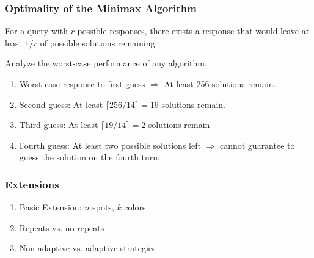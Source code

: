 \documentclass{beamer}
\begin{document}
    \begin{frame}
    	\frametitle{Optimality of the Minimax Algorithm}
	\begin{tcolorbox}[colback=blue!5,colframe=blue!40!black,title=Lemma (Pigeonhole Principle)]
	For a query with $r$ possible responses, there exists a response that would leave
	at least $1/r$ of possible solutions remaining.
	\end{tcolorbox}
	Analyze the worst-case performance of any algorithm. \\
		\begin{enumerate}[label=\roman*.]
		\item Worst case response to first guess $\Rightarrow$ At least 256 solutions
		remain.
		\item Second guess:  At least $\lceil 256/14 \rceil = 19$ solutions remain.
		\item Third guess: At least $\lceil 19/14 \rceil = 2$ solutions remain
		\item Fourth guess: At least two possible solutions left $\Rightarrow$ cannot
		guarantee to guess the solution on the fourth turn.
		\end{enumerate}
    \end{frame}

    \begin{frame}
    	\frametitle{Extensions}
		\begin{enumerate}[label=\roman*.]
		\item Basic Extension: $n$ spots, $k$ colors
		\item Repeats vs. no repeats
		\item Non-adaptive vs. adaptive strategies
		\end{enumerate}
    \end{frame}
    
\end{document}
